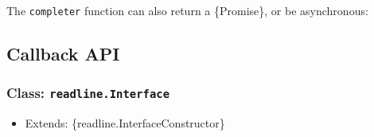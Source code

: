 \begin{Shaded}
\begin{Highlighting}[]
 
  \OperatorTok{=} \NormalTok{(}\StringTok{\textquotesingle{} \textquotesingle{}}\NormalTok{)}\OperatorTok{;}
  \OperatorTok{=}\KeywordTok{=\textgreater{}}\OperatorTok{;}
  \NormalTok{ [hits} \OperatorTok{:}\OperatorTok{,}\NormalTok{ line]}\OperatorTok{;}
\NormalTok{\}}
\end{Highlighting}
\end{Shaded}

The \texttt{completer} function can also return a \{Promise\}, or be
asynchronous:

\begin{Shaded}
\begin{Highlighting}[]
  
   \NormalTok{()}\OperatorTok{;}
  \NormalTok{ [[}\StringTok{\textquotesingle{}123\textquotesingle{}}\NormalTok{]}\OperatorTok{,}\NormalTok{ linePartial]}\OperatorTok{;}
\NormalTok{\}}
\end{Highlighting}
\end{Shaded}

\subsection{Callback API}\label{callback-api}

\subsubsection{\texorpdfstring{Class:
\texttt{readline.Interface}}{Class: readline.Interface}}\label{class-readline.interface}

\begin{itemize}
\tightlist
\item
  Extends: \{readline.InterfaceConstructor\}
\end{itemize}

